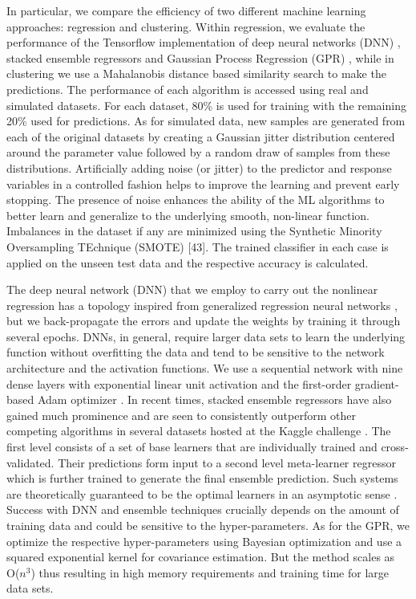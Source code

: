 \documentclass[twocolumn, aps, superscriptaddress]{revtex4}
\begin{document}
In particular, we compare the efficiency of two different machine learning approaches: regression and clustering. Within regression, we evaluate the performance of the Tensorflow implementation of deep neural networks (DNN) \citep{Abadi:2016:TSL:3026877.3026899}, stacked ensemble regressors \citep{wolpert1992stacked} and Gaussian Process Regression (GPR) \citep{rasmussen2006gaussian}, while in clustering we use a Mahalanobis distance \citep{Mahalanobis} based similarity search to make the predictions. The performance of each algorithm is accessed using real and simulated datasets. For each dataset, 80\% is used for training with the remaining 20\% used for predictions. As for simulated data, new samples are generated from each of the original datasets by creating a Gaussian jitter distribution centered around the parameter value followed by a random draw of samples from these distributions. Artificially adding noise (or jitter) to the predictor and response variables in a controlled fashion helps to improve the learning and prevent early stopping. The presence of noise enhances the ability of the ML algorithms to better learn and generalize to the underlying smooth, non-linear function. Imbalances in the dataset if any are minimized using the Synthetic Minority Oversampling TEchnique (SMOTE) [43]. The trained classifier in each case is applied on the unseen test data and the respective accuracy is calculated.

The deep neural network (DNN) that we employ to carry out the nonlinear regression has a topology inspired from generalized regression neural networks \cite{specht1991general}, but we back-propagate the errors and update the weights by training it through several epochs.   DNNs, in general, require larger data sets to learn the underlying function without overfitting the data and tend to be sensitive to the network architecture and the activation functions. We use a sequential network with nine dense layers with exponential linear unit activation and the first-order gradient-based Adam optimizer \cite{kingma2014adam}. In recent times, stacked ensemble regressors have also gained much prominence and are seen to consistently outperform other  competing algorithms in several datasets hosted at the Kaggle challenge \cite{Kaggle}. The first level consists of a set of base learners that are individually trained and cross-validated. Their predictions form input to a second level meta-learner regressor which is further trained to generate the final ensemble prediction.  Such systems are theoretically guaranteed to be the optimal learners in an asymptotic sense \cite{van2007super}. Success with DNN and ensemble techniques crucially depends on the amount of training data and could be sensitive to the hyper-parameters. As for the GPR, we optimize the respective hyper-parameters using Bayesian optimization and use a squared exponential kernel for covariance estimation. But the method scales as O($n^3$) thus resulting in high memory requirements and training time for large data sets.
\end{document}
